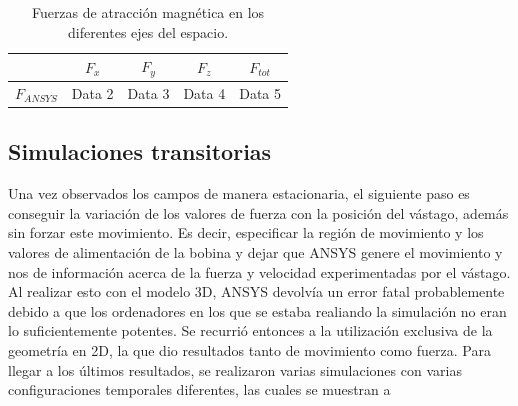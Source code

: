 \begin{table}[h]
    \centering
    \begin{tabular}{|c|c|c|c|c|}
        \hline
        & \(F_x\) & \(F_y\) & \(F_z\) & \(F_{tot}\) \\
        \hline
        \(F_{ANSYS}\) & Data 2 & Data 3 & Data 4 & Data 5 \\
        \hline
    \end{tabular}
    \caption{Fuerzas de atracción magnética en los diferentes ejes del espacio.}
    \label{tab:fuerzas}
\end{table}

\subsection{Simulaciones transitorias}
Una vez observados los campos de manera estacionaria, el siguiente paso es conseguir la variación de los valores de fuerza con la posición del vástago, además sin forzar este movimiento. Es decir, especificar la región de movimiento y los valores de alimentación de la bobina y dejar que ANSYS genere el movimiento y nos de información acerca de la fuerza y velocidad experimentadas por el vástago. Al realizar esto con el modelo 3D, ANSYS devolvía un error fatal probablemente debido a que los ordenadores en los que se estaba realiando la simulación no eran lo suficientemente potentes. Se recurrió entonces a la utilización exclusiva de la geometría en 2D, la que dio resultados tanto de movimiento como fuerza. Para llegar a los últimos resultados, se realizaron varias simulaciones con varias configuraciones temporales diferentes, las cuales se muestran a 
